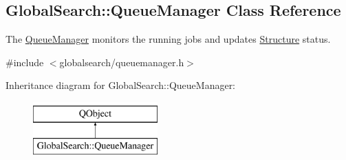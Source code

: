 \hypertarget{classGlobalSearch_1_1QueueManager}{}\subsection{Global\+Search\+:\+:Queue\+Manager Class Reference}
\label{classGlobalSearch_1_1QueueManager}


The \hyperlink{classGlobalSearch_1_1QueueManager}{Queue\+Manager} monitors the running jobs and updates \hyperlink{classGlobalSearch_1_1Structure}{Structure} status.  




{\ttfamily \#include $<$globalsearch/queuemanager.\+h$>$}

Inheritance diagram for Global\+Search\+:\+:Queue\+Manager\+:\begin{figure}[H]
\begin{center}
\leavevmode
\includegraphics[height=2.000000cm]{classGlobalSearch_1_1QueueManager}
\end{center}
\end{figure}
